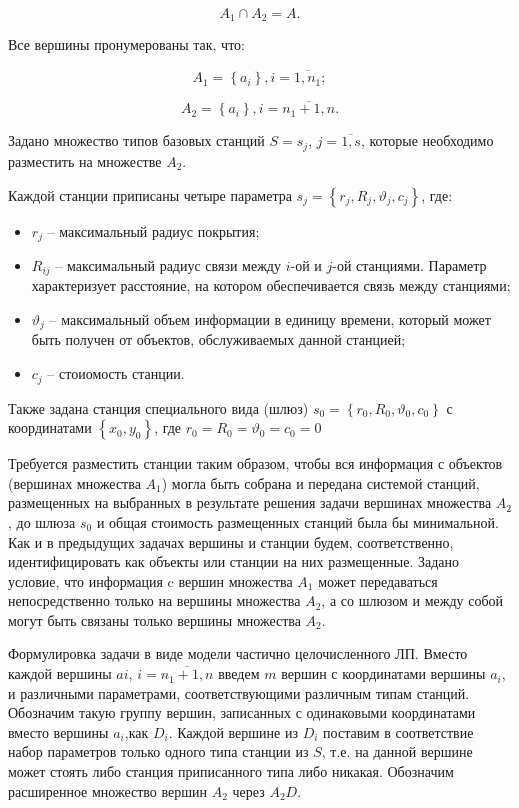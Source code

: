 $$
A_1 \cap A_2 = A.
$$

Все вершины пронумерованы так, что:

$$
A_1 = \left\{a_i \right\}, i= \overline{1,n_1};
$$

$$
A_2 = \left\{ a_i  \right\}, i= \overline{n_1+1,n}.
$$


Задано множество типов базовых станций $S = s_j$, $j=\overline{1,s}$, которые необходимо разместить на множестве $A_2$.

Каждой станции приписаны четыре параметра $s_j = \left\{r_j, R_j, \vartheta_j, c_j \right\}$, где: 
\begin{itemize}
    \item $r_j$ -- максимальный радиус покрытия;
    \item $R_{ij}$ -- максимальный радиус связи между $i$-ой и $j$-ой станциями. Параметр характеризует расстояние, на котором обеспечивается связь между станциями;
    \item $\vartheta_j$ -- максимальный объем информации в единицу времени, который может быть получен от объектов, обслуживаемых данной станцией;
    \item $c_j$ -- стоиомость станции.
\end{itemize}

Также задана станция специального вида (шлюз) $s_0 = \left\{ r_0, R_0, \vartheta_0, c_0 \right\}$ с координатами $\left\{x_0, y_0 \right\}$, где $r_0 = R_0 = \vartheta_0 = c_0 = 0$


Требуется разместить станции таким образом, чтобы вся информация с объектов (вершинах множества $A_1$) могла быть собрана и передана системой станций, размещенных на выбранных в результате решения задачи вершинах множества  $A_2$, до шлюза $s_0$ и общая стоимость размещенных станций была бы минимальной.
Как и в предыдущих задачах вершины и станции будем, соответственно, идентифицировать как объекты или станции на них размещенные.
Задано условие, что информация c вершин множества $A_1$ может передаваться непосредственно только на вершины множества $A_2$, а со шлюзом и между собой могут быть связаны только вершины множества $A_2$.

Формулировка задачи в виде модели частично целочисленного ЛП.
Вместо каждой вершины $ai$, $i= \overline{n_1+1,n}$ введем $m$ вершин с координатами вершины $a_i$, и различными параметрами, соответствующими различным типам станций. Обозначим такую группу вершин, записанных с одинаковыми координатами вместо вершины $a_i$,как $D_i$. Каждой вершине из $D_i$ поставим в соответствие набор параметров только одного типа станции из $S$, т.е. на данной вершине может стоять либо станция приписанного типа либо никакая. Обозначим расширенное множество вершин $A_2$ через $A_2D$.

